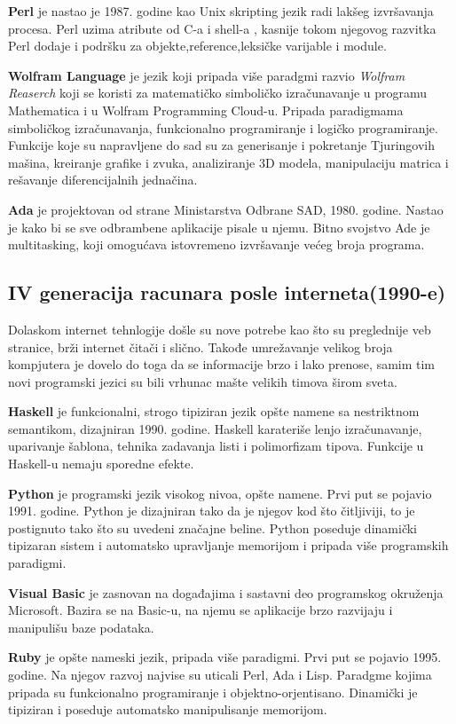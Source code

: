 \documentclass[a4paper]{article}
\begin{document}
\textbf{Perl} je nastao je 1987. godine kao Unix skripting jezik radi lakšeg izvršavanja procesa. Perl uzima atribute od C-a i shell-a , kasnije tokom njegovog razvitka Perl dodaje i podršku za objekte,reference,leksičke varijable i module.

\textbf{Wolfram Language} je jezik koji pripada više paradgmi razvio \emph{Wolfram Reaserch} koji se koristi za matematičko simboličko izračunavanje u programu Mathematica i u Wolfram Programming Cloud-u. Pripada paradigmama simboličkog izračunavanja, funkcionalno programiranje i logičko programiranje. Funkcije koje su napravljene do sad su za generisanje i pokretanje Tjuringovih mašina, kreiranje grafike i zvuka, analiziranje 3D modela, manipulaciju matrica i rešavanje diferencijalnih jednačina.

\textbf{Ada} je projektovan od strane Ministarstva Odbrane SAD, 1980. godine. Nastao  je kako bi se sve odbrambene aplikacije pisale u njemu. Bitno svojstvo Ade je multitasking, koji omogućava istovremeno izvršavanje većeg broja programa.

\subsection{IV generacija racunara posle interneta(1990-e)}
Dolaskom internet tehnlogije došle su nove potrebe kao što su preglednije veb stranice, brži internet čitači i slično. Takođe umrežavanje velikog broja kompjutera je dovelo do toga da se informacije brzo i lako prenose, samim tim novi programski jezici su bili vrhunac mašte velikih timova širom sveta. 

\textbf{Haskell} je funkcionalni, strogo tipiziran jezik opšte namene sa nestriktnom semantikom, dizajniran 1990. godine. Haskell karateriše lenjo izračunavanje, uparivanje šablona, tehnika zadavanja listi i polimorfizam tipova. Funkcije u Haskell-u nemaju sporedne efekte.

\textbf{Python} je programski jezik visokog nivoa, opšte namene. Prvi put se pojavio 1991. godine. Python je dizajniran tako da je njegov kod što čitljiviji, to je postignuto tako što su uvedeni značajne beline. Python poseduje dinamički tipizaran sistem i automatsko upravljanje memorijom i pripada više programskih paradigmi.

\textbf{Visual Basic} je zasnovan na događajima i sastavni deo programskog okruženja Microsoft. Bazira se na Basic-u, na njemu se aplikacije brzo razvijaju i manipulišu baze podataka.

\textbf{Ruby} je opšte nameski jezik, pripada više paradigmi. Prvi put se pojavio 1995. godine. Na njegov razvoj najvise su uticali Perl, Ada i Lisp. Paradgme kojima pripada su funkcionalno programiranje i objektno-orjentisano. Dinamički je tipiziran i poseduje automatsko manipulisanje memorijom.
\end{document}

